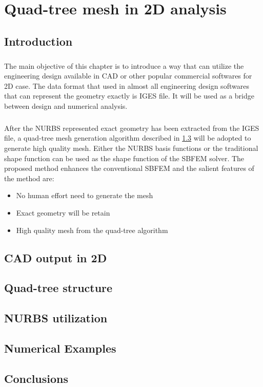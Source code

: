 \chapter{Quad-tree mesh in 2D analysis}

\section{Introduction}
\paragraph{}
The main objective of this chapter is to introduce a way that can utilize the engineering design available in CAD or other popular commercial softwares for 2D case.
The data format that used in almost all engineering design softwares that can represent the geometry exactly is IGES file.
It will be used as a bridge between design and numerical analysis.

\paragraph{}
After the NURBS represented exact geometry has been extracted from the IGES file, a quad-tree mesh generation algorithm described in \ref{qt_sc:quadtree} will be adopted to generate high quality mesh.
Either the NURBS basis functions or the traditional shape function can be used as the shape function of the SBFEM solver.
The proposed method enhances the conventional SBFEM and the salient features of the method are:
    \begin{itemize}
        \item No human effort need to generate the mesh
        \item Exact geometry will be retain
        \item High quality mesh from the quad-tree algorithm
    \end{itemize}
\pagebreak

\section{CAD output in 2D}
\label{qt_sc:iges}


\section{Quad-tree structure}
\label{qt_sc:quadtree}


\section{NURBS utilization}
\label{qt_sc:nurbs}



\section{Numerical Examples}

\section{Conclusions}